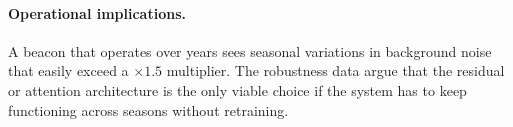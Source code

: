 \paragraph{Operational implications.}
A beacon that operates over years sees seasonal variations in
background noise that easily exceed a $\times 1.5$ multiplier. The
robustness data argue that the residual or attention architecture is
the only viable choice if the system has to keep functioning across
seasons without retraining.
